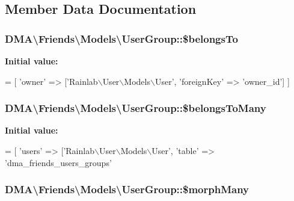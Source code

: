 \subsection{Member Data Documentation}
\hypertarget{classDMA_1_1Friends_1_1Models_1_1UserGroup_a941362fd666e66db70f4b5951cba0154}{
\subsubsection[{\$belongs\-To}]{\setlength{\rightskip}{0pt plus 5cm}D\-M\-A\textbackslash{}\-Friends\textbackslash{}\-Models\textbackslash{}\-User\-Group\-::\$belongs\-To}}\label{classDMA_1_1Friends_1_1Models_1_1UserGroup_a941362fd666e66db70f4b5951cba0154}
{\bfseries Initial value\-:}
\begin{DoxyCode}
= [
        \textcolor{stringliteral}{'owner'} => [\textcolor{stringliteral}{'Rainlab\(\backslash\)User\(\backslash\)Models\(\backslash\)User'}, \textcolor{stringliteral}{'foreignKey'} => \textcolor{stringliteral}{'owner\_id'}]    
    ]
\end{DoxyCode}
\hypertarget{classDMA_1_1Friends_1_1Models_1_1UserGroup_a09a5f57f3092a3bf0aa240cf8ca949a8}{
\subsubsection[{\$belongs\-To\-Many}]{\setlength{\rightskip}{0pt plus 5cm}D\-M\-A\textbackslash{}\-Friends\textbackslash{}\-Models\textbackslash{}\-User\-Group\-::\$belongs\-To\-Many}}\label{classDMA_1_1Friends_1_1Models_1_1UserGroup_a09a5f57f3092a3bf0aa240cf8ca949a8}
{\bfseries Initial value\-:}
\begin{DoxyCode}
= [
        \textcolor{stringliteral}{'users'} => [\textcolor{stringliteral}{'Rainlab\(\backslash\)User\(\backslash\)Models\(\backslash\)User'}, 
        \textcolor{stringliteral}{'table'} => \textcolor{stringliteral}{'dma\_friends\_users\_groups'}
\end{DoxyCode}
\hypertarget{classDMA_1_1Friends_1_1Models_1_1UserGroup_ad71c8521c1767d621fe10ea3ce822c3c}{
\subsubsection[{\$morph\-Many}]{\setlength{\rightskip}{0pt plus 5cm}D\-M\-A\textbackslash{}\-Friends\textbackslash{}\-Models\textbackslash{}\-User\-Group\-::\$morph\-Many}}\label{classDMA_1_1Friends_1_1Models_1_1UserGroup_ad71c8521c1767d621fe10ea3ce822c3c}
